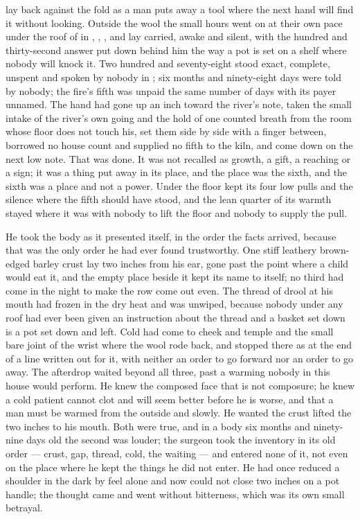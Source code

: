 
 lay back against the fold as a man puts away a tool where the next hand will find it without looking. Outside the wool the small hours went on at their own pace under the roof of  in , , , and  lay carried, awake and silent, with the hundred and thirty-second answer put down behind him the way a pot is set on a shelf where nobody will knock it. Two hundred and seventy-eight stood exact, complete, unspent and spoken by nobody in ; six months and ninety-eight days were told by nobody; the fire's fifth was unpaid the same number of days with its payer unnamed. The hand had gone up an inch toward the river's note, taken the small intake of the river's own going and the hold of one counted breath from the room whose floor does not touch his, set them side by side with a finger between, borrowed no house count and supplied no fifth to the kiln, and come down on the next low note. That was done. It was not recalled as growth, a gift, a reaching or a sign; it was a thing put away in its place, and the place was the sixth, and the sixth was a place and not a power. Under the floor  kept its four low pulls and the silence where the fifth should have stood, and the lean quarter of its warmth stayed where it was with nobody to lift the floor and nobody to supply the pull.

He took the body as it presented itself, in the order the facts arrived, because that was the only order he had ever found trustworthy. One stiff leathery brown-edged barley crust lay two inches from his ear, gone past the point where a child would eat it, and the empty place beside it kept its name to itself; no third had come in the night to make the row come out even. The thread of drool at his mouth had frozen in the dry heat and was unwiped, because nobody under any roof had ever been given an instruction about the thread and a basket set down is a pot set down and left. Cold had come to cheek and temple and the small bare joint of the wrist where the wool rode back, and stopped there as at the end of a line written out for it, with neither an order to go forward nor an order to go away. The afterdrop waited beyond all three, past a warming nobody in this house would perform. He knew the composed face that is not composure; he knew a cold patient cannot clot and will seem better before he is worse, and that a man must be warmed from the outside and slowly. He wanted the crust lifted the two inches to his mouth. Both were true, and in a body six months and ninety-nine days old the second was louder; the surgeon took the inventory in its old order --- crust, gap, thread, cold, the waiting --- and entered none of it, not even on the place where he kept the things he did not enter. He had once reduced a shoulder in the dark by feel alone and now could not close two inches on a pot handle; the thought came and went without bitterness, which was its own small betrayal.

